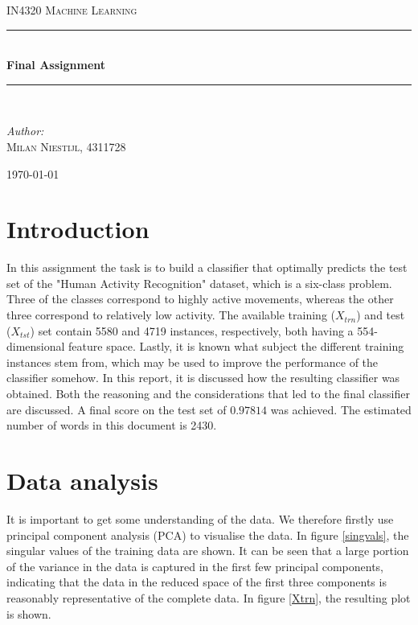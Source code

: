 \documentclass [a4paper] {report}
\begin{document}
	
	\begin{titlepage}
		\begin{center}
			
			\textsc{\LARGE IN4320 Machine Learning}\\[1.25cm]
			
			\rule{\linewidth}{0.5mm}\\[1.0cm]
			{\huge \bfseries Final Assignment }\\[0.6cm]
			\rule{\linewidth}{0.5mm}\\[1.5cm]
			
			\begin{minipage}{0.4\textwidth}
				\begin{flushleft} \large	
					\emph{Author:}\\
					\textsc{Milan Niestijl, 4311728}
				\end{flushleft}
			\end{minipage}
			
			\vfill
			{\large \today}
		\end{center}
	\end{titlepage}
	
	\section*{Introduction}
	In this assignment the task is to build a classifier that optimally predicts the test set of the "Human Activity Recognition" dataset, which is a six-class problem. Three of the classes correspond to highly active movements, whereas the other three correspond to relatively low activity. The available training ($X_{trn}$) and test ($X_{tst}$) set contain 5580 and 4719 instances, respectively, both having a 554-dimensional feature space. Lastly, it is known what subject the different training instances stem from, which may be used to improve the performance of the classifier somehow. In this report, it is discussed how the resulting classifier was obtained. Both the reasoning and the considerations that led to the final classifier are discussed. A final score on the test set of $0.97814$ was achieved. The estimated number of words in this document is 2430.\\
	

	\section*{Data analysis}
	It is important to get some understanding of the data. We therefore firstly use principal component analysis (PCA) to visualise the data. In figure \ref{singvals}, the singular values of the training data are shown. It can be seen that a large portion of the variance in the data is captured in the first few principal components, indicating that the data in the reduced space of the first three components is reasonably representative of the complete data. In figure \ref{Xtrn}, the resulting plot is shown. 
	
\end{document}
